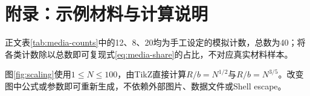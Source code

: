\chapter*{附录：示例材料与计算说明}
正文表\ref{tab:media-counts}中的12、8、20均为手工设定的模拟计数，总数为40；将各类计数除以总数即可复现式\eqref{eq:media-share}的占比，不对应真实材料样本。

图\ref{fig:scaling}使用$1\leq N\leq100$，由TikZ直接计算$R/b=N^{1/2}$与$R/b=N^{3/5}$。改变图中公式或参数即可重新生成，不依赖外部图片、数据文件或Shell escape。
